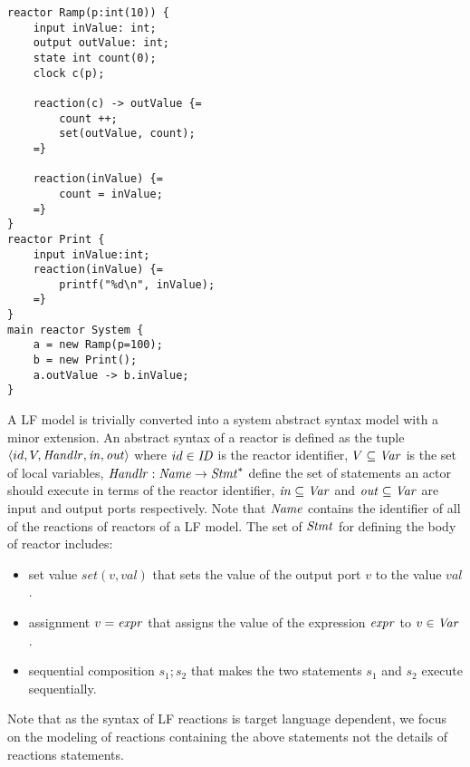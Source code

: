 \begin{lstlisting}[language=LF, multicols=2, caption=Example of a \texttt{Ramp} feeding into a \texttt{Print} reactor (inspired from a LF model presented in \cite{DBLP:conf/dac/LohstrohSGWGSL19}), label=src::LF]
reactor Ramp(p:int(10)) { 
    input inValue: int;
    output outValue: int;
    state int count(0);
    clock c(p);
    
    reaction(c) -> outValue {=
        count ++;
        set(outValue, count); 
    =}
    
    reaction(inValue) {= 
        count = inValue;
    =} 
}
reactor Print { 
    input inValue:int; 
    reaction(inValue) {=
        printf("%d\n", inValue); 
    =}
}
main reactor System {
    a = new Ramp(p=100);
    b = new Print(); 
    a.outValue -> b.inValue;
}
\end{lstlisting}

A LF model is trivially converted into a system abstract syntax model with a minor extension. An abstract syntax of a reactor is defined as the tuple $\langle id, V, \mathit{Handlr}, \mathit{in}, \mathit{out}\rangle $ where $id\in \mathit{ID}$ is the reactor identifier, $V \subseteq \mathit{Var}$ is the set of local variables, $\mathit{Handlr} : \mathit{Name} \rightarrow \mathit{Stmt}^*$ define the set of statements an actor should execute in terms of the reactor identifier, $\mathit{in} \subseteq \mathit{Var}$ and $\mathit{out} \subseteq \mathit{Var}$ are input and output ports respectively. Note that $\mathit{Name}$ contains the identifier of all of the reactions of reactors of a LF model. %
The set of $\mathit{Stmt}$ for defining the body of reactor includes:\begin{itemize}
    \item set value $set(v, val)$ that sets the value of the output port $v$ to the value $val$.
    \item assignment $v={\it expr}$ that assigns the value of the expression ${\it expr}$ to $v\in\mathit{Var}$.
    \item sequential composition $s_1;s_2$ that makes the two statements $s_1$ and $s_2$ execute sequentially.
\end{itemize}
Note that as the syntax of LF reactions is target language dependent, we focus on the modeling of reactions containing the above statements not the details of reactions statements.


